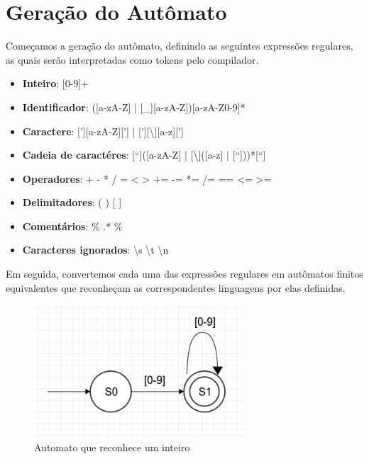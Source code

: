 \section{Geração do Autômato}

Começamos a geração do autômato, definindo as seguintes expressões regulares, as quais serão interpretadas como tokens pelo compilador.

\begin{itemize}
	\item \textbf{Inteiro}: [0-9]+

	\item \textbf{Identificador}: ([a-zA-Z] | [\_][a-zA-Z])[a-zA-Z0-9]*

	\item \textbf{Caractere}: ['][a-zA-Z]['] | ['][\textbackslash ][a-z][']

	\item \textbf{Cadeia de caractéres}: [“]([a-zA-Z] | [\textbackslash ]([a-z] | [“]))*[“]

	\item \textbf{Operadores}: + - * / = < > += -= *= /= == <= >=

	\item \textbf{Delimitadores}: ( ) { } [ ]

	\item \textbf{Comentários}: \% .* \%

	\item \textbf{Caracteres ignorados}: \textbackslash s \textbackslash t \textbackslash n
\end{itemize}

Em seguida, convertemos cada uma das expressões regulares em autômatos finitos equivalentes que reconheçam as correspondentes linguagens por elas definidas.

\begin{figure}[H]
  \caption{Automato que reconhece um inteiro}
  \centering
    \includegraphics[width=0.7\textwidth]{../0-lexico/automatos/integer}
\end{figure}

